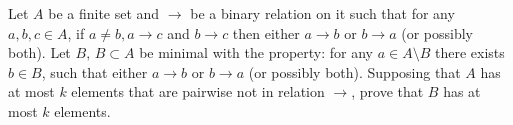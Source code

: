 Let ${A}$ be a finite set and ${\rightarrow}$ be a binary relation on it such that for any ${a,b,c \in A}$, if ${a\neq b}, {a \rightarrow c}$ and ${b \rightarrow c}$ then either ${a \rightarrow b}$ or ${b \rightarrow a}$ (or possibly both). Let ${B,\,B \subset A}$ be minimal with the property: for any ${a \in A \setminus B}$ there exists ${b \in B}$, such that either ${a \rightarrow b}$ or ${b \rightarrow a}$ (or possibly both).
Supposing that ${A}$ has at most ${k}$ elements that are pairwise not in relation ${\rightarrow}$, prove that ${B}$ has at most ${k}$ elements.